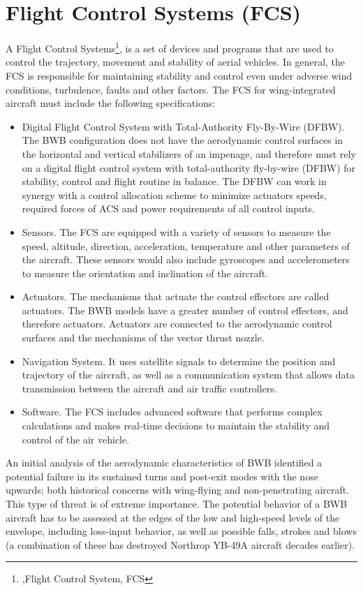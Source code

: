 \section{Flight Control Systems (FCS)}
%
A Flight Control Systems\footnote{,Flight Control System, FCS}, is a set of devices and programs that are used to control the trajectory, movement and stability of aerial vehicles. 
%
In general, the FCS is responsible for maintaining stability and control even under adverse wind conditions, turbulence, faults and other factors. 
%
The FCS for wing-integrated aircraft must include the following specifications:
\begin{itemize}
    \item  Digital Flight Control System with Total-Authority Fly-By-Wire (DFBW). The BWB configuration does not have the aerodynamic control surfaces in the horizontal and vertical stabilizers of an impenage, and therefore must rely on a digital flight control system with total-authority fly-by-wire (DFBW) for stability, control and flight routine in balance. The DFBW can work in synergy with a control allocation scheme to minimize actuators speeds, required forces of ACS and power requirements of all control inputs.
    \item Sensors. The FCS are equipped with a variety of sensors to measure the speed, altitude, direction, acceleration, temperature and other parameters of the aircraft. These sensors would also include gyroscopes and accelerometers to measure the orientation and inclination of the aircraft. 
    \item Actuators. The mechanisms that actuate the control effectors are called actuators. The BWB models have a greater number of control effectors, and therefore actuators. Actuators are connected to the aerodynamic control surfaces and the mechanisms of the vector thrust nozzle.
    \item Navigation System. It uses satellite signals to determine the position and trajectory of the aircraft, as well as a communication system that allows data transmission between the aircraft and air traffic controllers. 
    \item Software. The FCS includes advanced software that performs complex calculations and makes real-time decisions to maintain the stability and control of the air vehicle.
\end{itemize}
%
An initial analysis of the aerodynamic characteristics of BWB identified a potential failure in its sustained turns and post-exit modes with the nose upwards; both historical concerns with wing-flying and non-penetrating aircraft. This type of threat is of extreme importance. The potential behavior of a BWB aircraft has to be assessed at the edges of the low and high-speed levels of the envelope, including loss-input behavior, as well as possible falls, strokes and blows (a combination of these has destroyed Northrop YB-49A aircraft decades earlier).

